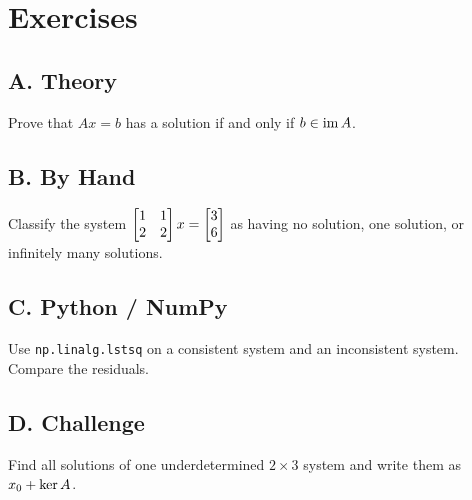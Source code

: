 \section*{Exercises}
\subsection*{A. Theory}
\begin{exercise} Prove that $Ax=b$ has a solution if and only if $b\in\operatorname{im} A$. \end{exercise}
\subsection*{B. By Hand}
\begin{exercise} Classify the system $\begin{bmatrix}1&1\\2&2\end{bmatrix}x=\begin{bmatrix}3\\6\end{bmatrix}$ as having no solution, one solution, or infinitely many solutions. \end{exercise}
\subsection*{C. Python / NumPy}
\begin{exercise} Use \texttt{np.linalg.lstsq} on a consistent system and an inconsistent system. Compare the residuals. \end{exercise}
\subsection*{D. Challenge}
\begin{exercise} Find all solutions of one underdetermined $2\times 3$ system and write them as $x_0+\operatorname{ker} A$. \end{exercise}
